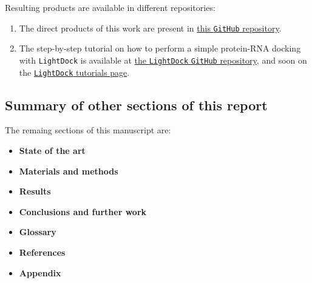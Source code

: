 Resulting products are available in different repositories:
\begin{enumerate}
    \item The direct products of this work are present in \href{https://github.com/luksgrin/UOC_TFM}{this \texttt{GitHub} repository}.
    \item The step-by-step tutorial on how to perform a simple protein-RNA docking with \texttt{LightDock} is available at \href{https://github.com/lightdock/lightdock.github.io}{the \texttt{LightDock} \texttt{GitHub} repository}, and soon on the \href{https://lightdock.org/tutorials/}{\texttt{LightDock} tutorials page}.
\end{enumerate}

\subsection{Summary of other sections of this report}


The remaing sections of this manuscript are:

\begin{itemize}
    \item\textbf{State of the art}
    \item\textbf{Materials and methods}
    \item\textbf{Results}
    \item\textbf{Conclusions and further work}
    \item\textbf{Glossary}
    \item\textbf{References}
    \item\textbf{Appendix}
\end{itemize}



